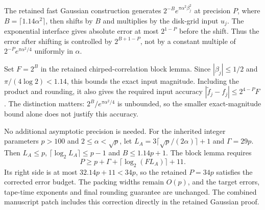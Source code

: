 \label{sec:chirp-scaling-correction}

The retained fast Gaussian construction generates
$2^{-B}e^{\pi\alpha^2\beta_j^2}$ at precision $P$, where
$B=\lceil1.14\alpha^2\rceil$, then shifts by $B$ and multiplies by
the disk-grid input $u_j$. The exponential interface gives absolute
error at most $2^{1-P}$ before the shift. Thus the error after shifting
is controlled by $2^{B+1-P}$, not by a constant multiple of
$2^{-P}e^{\pi\alpha^2/4}$ uniformly in $\alpha$.

Set $F=2^B$ in the retained chirped-correlation block lemma. Since
$|\beta_j|\le1/2$ and $\pi/(4\log 2)<1.14$, this bounds the exact
input magnitude. Including the product and rounding, it also gives
the required input accuracy $|\widetilde f_j-f_j|\le2^{4-P}F$.
The distinction matters: $2^B/e^{\pi\alpha^2/4}$ is unbounded, so
the smaller exact-magnitude bound alone does not justify this accuracy.

No additional asymptotic precision is needed. For the inherited integer
parameters $p>100$ and $2\le\alpha<\sqrt p$, let
$L_A=3\lceil\sqrt p/(2\alpha)\rceil+1$ and $\Gamma=29p$.
Then $L_A\le p$, $\lceil\log_2 L_A\rceil\le p-1$ and
$B\le1.14p+1$. The block lemma requires
\[
 P\ge p+\Gamma+\lceil\log_2(FL_A)\rceil+11.
\]
Its right side is at most $32.14p+11<34p$, so the retained
$P=34p$ satisfies the corrected error budget. The packing widths
remain $O(p)$, and the target errors, tape-time exponents and final
rounding guarantee are unchanged. The combined manuscript patch
includes this correction directly in the retained Gaussian proof.
